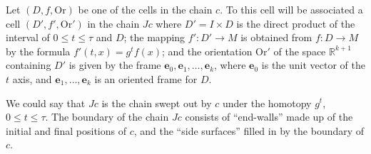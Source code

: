 \documentclass{book}
\numberwithin{equation}{section}
\theoremstyle{plain}
\theoremstyle{definition}
\theoremstyle{remark}
\theoremstyle{remark}
\begin{document}
Let $(D, f, \mathrm{Or})$ be one of the cells in the chain $c$.
%
To this cell will be associated a cell $(D', f', \mathrm{Or}')$
  in the chain $Jc$ where $D' = I\times D$ is the direct product
  of the interval of $0 \le t \le \tau$ and $D$;
  the mapping $f': D' \rightarrow M$ is obtained from
  $f: D \rightarrow M$ by the formula
  $f'(t, x) = g^t f(x)$;
  and the orientation $\mathrm{Or}'$ of the space $\mathbb{R}^{k+1}$
  containing $D'$ is given by the frame
  $\mathbf e_0, \mathbf e_1, \dots, \mathbf e_k$,
  where $\mathbf e_0$ is the unit vector of the $t$ axis,
  and $\mathbf e_1, \dots, \mathbf e_k$ is an oriented frame for $D$.


We could say that $Jc$ is the chain swept out by $c$
  under the homotopy $g^t$, $0 \le t \le \tau$.
  The boundary of the chain $Jc$ consists of ``end-walls''
  made up of the initial and final positions of $c$,
  and the ``side surfaces'' filled in by the boundary of $c$.
\end{document}
